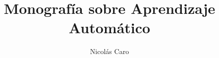 \documentclass{amsbook}
\theoremstyle{definition}
\theoremstyle{remark}
\numberwithin{section}{chapter}
\numberwithin{equation}{chapter}
\begin{document}
\frontmatter
\title{Monografía sobre Aprendizaje Automático}

\author{Nicolás Caro}
\address{Departamento de Ingenieria Matematica, Universidad de Chile, Santiago.}

\maketitle

\setcounter{page}{4}
\tableofcontents



\mainmatter







\backmatter


\end{document}

